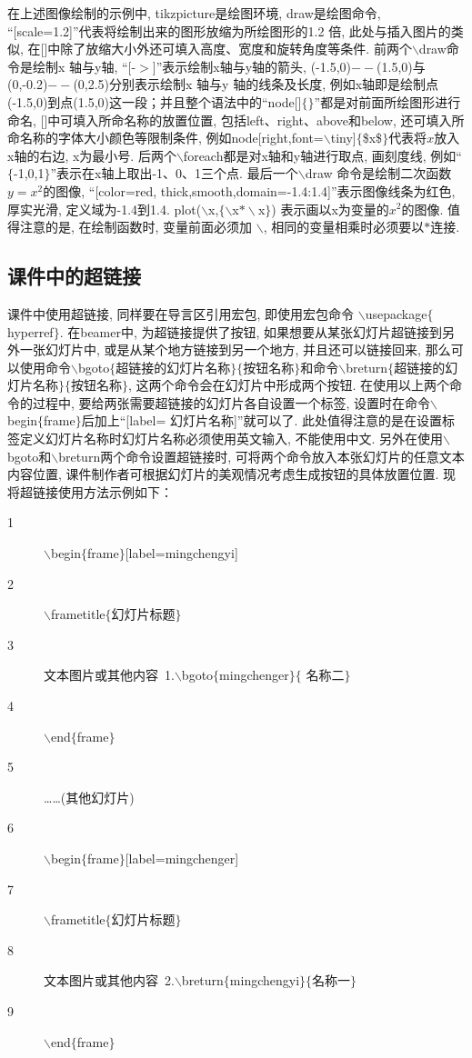 在上述图像绘制的示例中, tikzpicture是绘图环境, draw是绘图命令, “[scale=1.2]”代表将绘制出来的图形放缩为所绘图形的1.2 倍, 此处与插入图片的类似, 在[]中除了放缩大小外还可填入高度、宽度和旋转角度等条件. 前两个$\backslash$draw命令是绘制x 轴与y轴, “[-$>$]”表示绘制x轴与y轴的箭头, (-1.5,0)$--$(1.5,0)与(0,-0.2)$--$(0,2.5)分别表示绘制x 轴与y 轴的线条及长度, 例如x轴即是绘制点(-1.5,0)到点(1.5,0)这一段；并且整个语法中的“node[]$\{\}$”都是对前面所绘图形进行命名, []中可填入所命名称的放置位置, 包括left、right、above和below, 还可填入所命名称的字体大小颜色等限制条件, 例如node[right,font=$\backslash$tiny]$\{$\$x\$$\}$代表将$x$放入x轴的右边, x为最小号. 后两个$\backslash$foreach都是对x轴和y轴进行取点, 画刻度线, 例如“$\{$-1,0,1$\}$”表示在x轴上取出-1、0、1三个点. 最后一个$\backslash$draw 命令是绘制二次函数$y=x^2$的图像,
“[color=red, thick,smooth,domain=-1.4:1.4]”表示图像线条为红色, 厚实光滑, 定义域为-1.4到1.4. plot($\backslash$x,$\{\backslash$x$*\backslash$x$\}$) 表示画以x为变量的$x^2$的图像. 值得注意的是, 在绘制函数时, 变量前面必须加
$\backslash$, 相同的变量相乘时必须要以$*$连接.
\subsection{课件中的超链接}

课件中使用超链接, 同样要在导言区引用宏包, 即使用宏包命令
$\backslash$usepackage$\{$hyperref$\}$. 在beamer中, 为超链接提供了按钮, 如果想要从某张幻灯片超链接到另外一张幻灯片中, 或是从某个地方链接到另一个地方, 并且还可以链接回来, 那么可以使用命令$\backslash$bgoto$\{$超链接的幻灯片名称$\}\{$按钮名称$\}$和命令$\backslash$breturn$\{$超链接的幻灯片名称$\}\{$按钮名称$\}$, 这两个命令会在幻灯片中形成两个按钮. 在使用以上两个命令的过程中, 要给两张需要超链接的幻灯片各自设置一个标签, 设置时在命令$\backslash$begin$\{$frame$\}$后加上“[label= 幻灯片名称]”就可以了. 此处值得注意的是在设置标签定义幻灯片名称时幻灯片名称必须使用英文输入, 不能使用中文. 另外在使用$\backslash$bgoto和$\backslash$breturn两个命令设置超链接时, 可将两个命令放入本张幻灯片的任意文本内容位置, 课件制作者可根据幻灯片的美观情况考虑生成按钮的具体放置位置. 现将超链接使用方法示例如下：
\begin{description}
  \item[1]$\backslash$begin$\{$frame$\}$[label=mingchengyi]
  \item[2]$\backslash$frametitle$\{$幻灯片标题$\}$
  \item[3] 文本图片或其他内容~1.$\backslash$bgoto$\{$mingchenger$\}\{$ 名称二$\}$
  \item[4]$\backslash$end$\{$frame$\}$
  \item[5] \ldots\ldots(其他幻灯片)
  \item[6]$\backslash$begin$\{$frame$\}$[label=mingchenger]
  \item[7]$\backslash$frametitle$\{$幻灯片标题$\}$
  \item[8] 文本图片或其他内容~2.$\backslash$breturn$\{$mingchengyi$\}\{$名称一$\}$
  \item[9]$\backslash$end$\{$frame$\}$
   \end{description}


